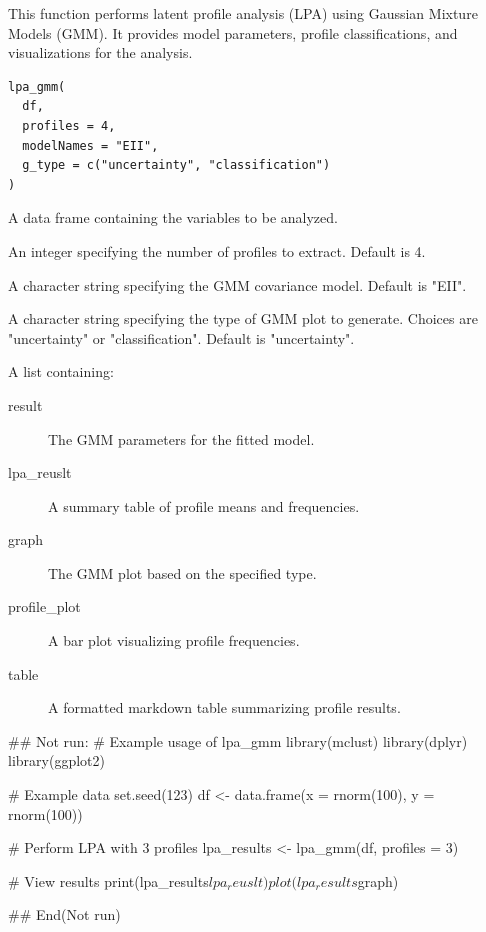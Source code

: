 \documentclass[a4paper]{book}
\begin{document}
%
\begin{Description}
This function performs latent profile analysis (LPA) using Gaussian Mixture Models (GMM).
It provides model parameters, profile classifications, and visualizations for the analysis.
\end{Description}
%
\begin{Usage}
\begin{verbatim}
lpa_gmm(
  df,
  profiles = 4,
  modelNames = "EII",
  g_type = c("uncertainty", "classification")
)
\end{verbatim}
\end{Usage}
%
\begin{Arguments}
\begin{ldescription}
\item[\code{df}] A data frame containing the variables to be analyzed.

\item[\code{profiles}] An integer specifying the number of profiles to extract. Default is 4.

\item[\code{modelNames}] A character string specifying the GMM covariance model. Default is "EII".

\item[\code{g\_type}] A character string specifying the type of GMM plot to generate.
Choices are "uncertainty" or "classification". Default is "uncertainty".
\end{ldescription}
\end{Arguments}
%
\begin{Value}
A list containing:
\begin{description}

\item[result] The GMM parameters for the fitted model.
\item[lpa\_reuslt] A summary table of profile means and frequencies.
\item[graph] The GMM plot based on the specified type.
\item[profile\_plot] A bar plot visualizing profile frequencies.
\item[table] A formatted markdown table summarizing profile results.

\end{description}

\end{Value}
%
\begin{Examples}
\begin{ExampleCode}
## Not run: 
# Example usage of lpa_gmm
library(mclust)
library(dplyr)
library(ggplot2)

# Example data
set.seed(123)
df <- data.frame(x = rnorm(100), y = rnorm(100))

# Perform LPA with 3 profiles
lpa_results <- lpa_gmm(df, profiles = 3)

# View results
print(lpa_results$lpa_reuslt)
plot(lpa_results$graph)

## End(Not run)
\end{ExampleCode}
\end{Examples}
\end{document}
